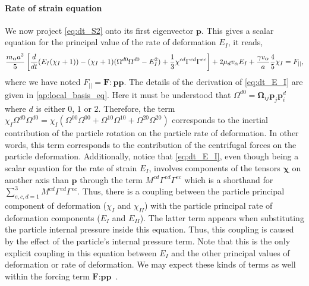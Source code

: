 \paragraph*{Rate of strain equation}
We now project \ref{eq:dt_S2} onto its first eigenvector $\textbf{p}$.
This gives a scalar equation for the principal value of the rate of deformation $E_I$, it reads, 
\begin{equation}
    \frac{m_\alpha a^2}{5} \left[
        \ddt (E_I (\chi_I+1))
        - (\chi_I+1)( \Omega^{d0} \Omega^{d0}  - E_I^2) 
        + \frac{1}{3} \chi^{cd}
        \Gamma^{ed}\Gamma^{ec}
    \right]
    + 2 \mu_d v_\alpha E_I
    + \frac{\gamma v_\alpha }{a} 
    \frac{4  }{5} \chi_I
    = F_{||},
    \label{eq:dt_E_I}
\end{equation} 
where we have noted $F_{||} = \textbf{F}: \textbf{pp}$.
The details of the derivation of \ref{eq:dt_E_I} are given in \ref{ap:local_basis_eq}. 
Here it must be understood that $\Omega^{d0}  = \bm\Omega_{ij} \textbf{p}_j \textbf{p}^{d}_i $ where $d$ is either $0$, $1$ or $2$. 
Therefore, the term $\chi_I \Omega^{d0} \Omega^{d0} =\chi_I (\Omega^{00} \Omega^{00} + \Omega^{10} \Omega^{10} +\Omega^{20} \Omega^{20} ) $ corresponds to the inertial contribution of the particle rotation on the particle rate of deformation. 
In other words, this term corresponds to the contribution of the centrifugal forces on the particle deformation. 
Additionally, notice that \ref{eq:dt_E_I}, even though being a scalar equation for the rate of strain $E_I$, involves components of the tensors $\bm\chi$ on another axis than $\textbf{p}$ through the term $M^{cd}\Gamma^{ed}\Gamma^{ec}$ which is a shorthand for $\sum_{e,c,d=1}^3 M^{cd}\Gamma^{ed}\Gamma^{ec}$. 
Thus, there is a coupling between the particle principal component of deformation ($\chi_I$ and $\chi_{II}$) with the particle principal rate of deformation components ($E_I$ and $E_{II}$).
The latter term appears when substituting the particle internal pressure inside this equation. 
Thus, this coupling is caused by the effect of the particle's internal pressure term. 
Note that this is the only explicit coupling in this equation between $E_I$ and the other principal values of deformation or rate of deformation. 
We may expect these kinds of terms as well within the forcing term $\textbf{F}:\textbf{pp}$ . 


